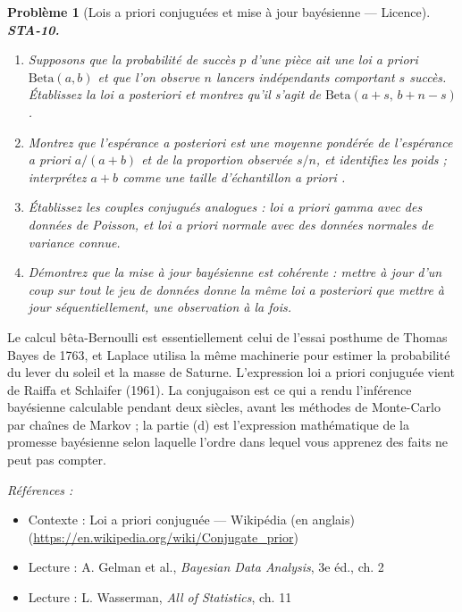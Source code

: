 \documentclass[11pt]{article}
\newtheorem{problem}{Problème}
\newenvironment{refs}{\par\small\noindent\emph{Références :}\begin{itemize}\setlength\itemsep{0pt}}{\end{itemize}\normalsize}
\begin{document}
\bigskip

\begin{problem}[{Lois a priori conjuguées et mise à jour bayésienne --- Licence}]
\textbf{STA-10.} \begin{enumerate}
\item[(a)] Supposons que la probabilité de succès $ p $ d'une pièce ait une loi a priori
$ \mathrm{Beta}(a, b) $ et que l'on observe $ n $ lancers indépendants comportant $ s $
succès. Établissez la loi a posteriori et montrez qu'il s'agit de
$ \mathrm{Beta}(a + s,\, b + n - s) $.
\item[(b)] Montrez que l'espérance a posteriori est une moyenne pondérée de l'espérance a priori
$ a/(a+b) $ et de la proportion observée $ s/n $, et identifiez les poids ; interprétez
$ a + b $ comme une \og{} taille d'échantillon a priori \fg{}.
\item[(c)] Établissez les couples conjugués analogues : loi a priori gamma avec des données de Poisson, et
loi a priori normale avec des données normales de variance connue.
\item[(d)] Démontrez que la mise à jour bayésienne est cohérente : mettre à jour d'un coup sur tout le jeu
de données donne la même loi a posteriori que mettre à jour séquentiellement, une observation à la
fois.
\end{enumerate}

\end{problem}

\noindent Le calcul bêta-Bernoulli est essentiellement celui de l'essai posthume de
Thomas Bayes de 1763, et Laplace utilisa la même machinerie pour estimer la probabilité du lever du
soleil et la masse de Saturne. L'expression \og{} loi a priori conjuguée \fg{} vient de Raiffa et Schlaifer
(1961). La conjugaison est ce qui a rendu l'inférence bayésienne calculable pendant deux siècles,
avant les méthodes de Monte-Carlo par chaînes de Markov ; la partie (d) est l'expression
mathématique de la promesse bayésienne selon laquelle l'ordre dans lequel vous apprenez des faits
ne peut pas compter.

\begin{refs}
\item Contexte : Loi a priori conjuguée --- Wikipédia (en anglais) (\url{https://en.wikipedia.org/wiki/Conjugate_prior})
\item Lecture : A. Gelman et al., \textit{Bayesian Data Analysis}, 3e éd., ch. 2
\item Lecture : L. Wasserman, \textit{All of Statistics}, ch. 11
\end{refs}
\end{document}
